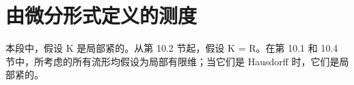 \section{由微分形式定义的测度}

本段中，假设 K 是局部紧的。从第 10.2 节起，假设 K = R。在第 10.1 和 10.4 节中，所考虑的所有流形均假设为局部有限维；当它们是 Hausdorff 时，它们是局部紧的。

